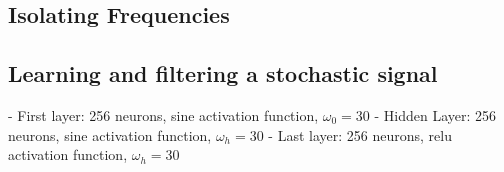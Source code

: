\subsection{Isolating Frequencies}





\subsection{Learning and filtering a stochastic signal}



- First layer: 256 neurons, sine activation function, $\omega_0=30$
- Hidden Layer: 256 neurons, sine activation function, $\omega_h=30$
- Last layer: 256 neurons, relu activation function, $\omega_h=30$







